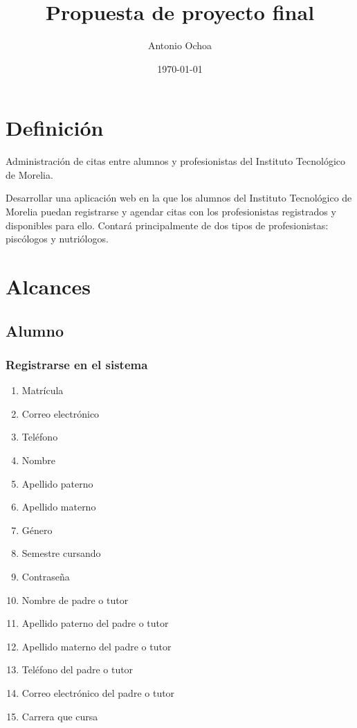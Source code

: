 \documentclass[11pt]{article}
\author{Antonio Ochoa}
\date{\today}
\title{Propuesta de proyecto final}
\begin{document}
\maketitle
\tableofcontents


\section{Definición}
\label{sec-1}

Administración de citas entre alumnos y profesionistas del Instituto
Tecnológico de Morelia.

Desarrollar una aplicación web en la que los alumnos del Instituto
Tecnológico de Morelia puedan registrarse y agendar citas con los profesionistas
registrados y disponibles para ello. Contará principalmente de dos tipos de
profesionistas: piscólogos y nutriólogos.

\section{Alcances}
\label{sec-2}
\subsection{Alumno}
\label{sec-2-1}
\subsubsection{Registrarse en el sistema}
\label{sec-2-1-1}
\begin{enumerate}
\item Matrícula
\label{sec-2-1-1-1}
\item Correo electrónico
\label{sec-2-1-1-2}
\item Teléfono
\label{sec-2-1-1-3}
\item Nombre
\label{sec-2-1-1-4}
\item Apellido paterno
\label{sec-2-1-1-5}
\item Apellido materno
\label{sec-2-1-1-6}
\item Género
\label{sec-2-1-1-7}
\item Semestre cursando
\label{sec-2-1-1-8}
\item Contraseña
\label{sec-2-1-1-9}
\item Nombre de padre o tutor
\label{sec-2-1-1-10}
\item Apellido paterno del padre o tutor
\label{sec-2-1-1-11}
\item Apellido materno del padre o tutor
\label{sec-2-1-1-12}
\item Teléfono del padre o tutor
\label{sec-2-1-1-13}
\item Correo electrónico del padre o tutor
\label{sec-2-1-1-14}
\item Carrera que cursa
\label{sec-2-1-1-15}
\end{enumerate}
\end{document}
